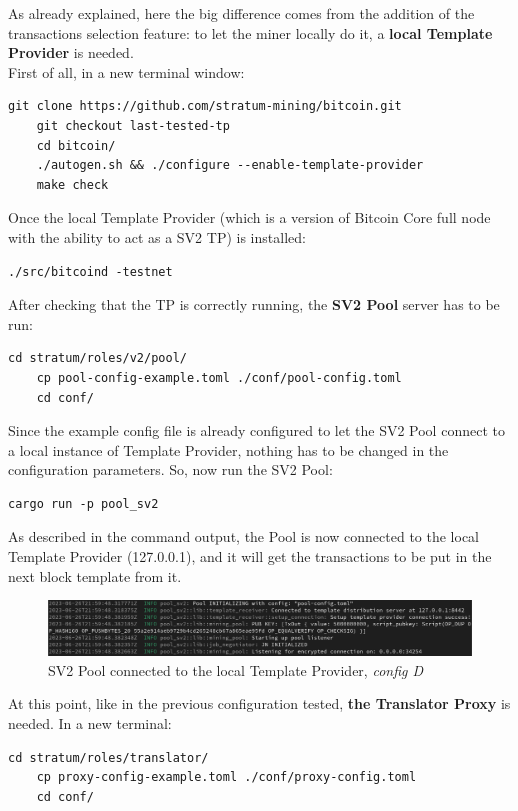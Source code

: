 \noindent As already explained, here the big difference comes from the addition of the transactions selection feature: to let the miner locally do it, a \textbf{local Template Provider} is needed.\\
First of all, in a new terminal window:
\begin{lstlisting}[style=bashStyle, numbers=none]
    git clone https://github.com/stratum-mining/bitcoin.git 
    git checkout last-tested-tp 
    cd bitcoin/
    ./autogen.sh && ./configure --enable-template-provider
    make check
\end{lstlisting}
Once the local Template Provider (which is a version of Bitcoin Core full node with the ability to act as a SV2 TP) is installed:
\begin{lstlisting}[style=bashStyle, numbers=none]
    ./src/bitcoind -testnet
\end{lstlisting}
After checking that the TP is correctly running, the \textbf{SV2 Pool} server has to be run:
\begin{lstlisting}[style=bashStyle, numbers=none]
    cd stratum/roles/v2/pool/
    cp pool-config-example.toml ./conf/pool-config.toml
    cd conf/
\end{lstlisting}
Since the example config file is already configured to let the SV2 Pool connect to a local instance of Template Provider, nothing has to be changed in the configuration parameters. So, now run the SV2 Pool:
\begin{lstlisting}[style=bashStyle, numbers=none]
    cargo run -p pool_sv2 
\end{lstlisting}
As described in the command output, the Pool is now connected to the local Template Provider (127.0.0.1), and it will get the transactions to be put in the next block template from it.
\begin{figure}[h!]
    \centering
    \includegraphics[width=15cm]{Figures/sri/configD_1.png}
    \caption{SV2 Pool connected to the local Template Provider, \textit{config D}}
    \label{fig:configD_1}
\end{figure}
\newline
\noindent At this point, like in the previous configuration tested, \textbf{the Translator Proxy} is needed. In a new terminal:
\begin{lstlisting}[style=bashStyle, numbers=none]
    cd stratum/roles/translator/
    cp proxy-config-example.toml ./conf/proxy-config.toml
    cd conf/
\end{lstlisting}
